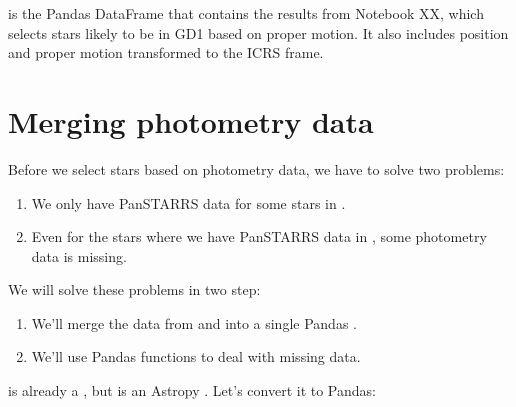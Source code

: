 \documentclass[letterpaper,10pt,english]{sphinxmanual}
\begin{document}
 is the Pandas DataFrame that contains the results from Notebook XX, which selects stars likely to be in GD\sphinxhyphen{}1 based on proper motion.  It also includes position and proper motion transformed to the ICRS frame.


\section{Merging photometry data}
\label{\detokenize{06_photo:merging-photometry-data}}
Before we select stars based on photometry data, we have to solve two problems:
\begin{enumerate}
%
\item {} 
We only have Pan\sphinxhyphen{}STARRS data for some stars in .

\item {} 
Even for the stars where we have Pan\sphinxhyphen{}STARRS data in , some photometry data is missing.

\end{enumerate}

We will solve these problems in two step:
\begin{enumerate}
%
\item {} 
We’ll merge the data from  and  into a single Pandas .

\item {} 
We’ll use Pandas functions to deal with missing data.

\end{enumerate}

 is already a , but  is an Astropy .  Let’s convert it to Pandas:

\begin{sphinxVerbatim}[commandchars=\\\{\}]
  

   
\end{sphinxVerbatim}
\end{document}

